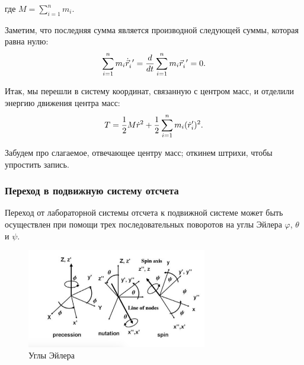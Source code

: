 \hspace*{-0.75cm} где $M = \sum_{i=1}^{n} m_i$.

Заметим, что последняя сумма является производной следующей суммы, которая равна нулю: 
\vspace*{-0.1cm}
\begin{gather}
\sum_{i=1}^{n} m_i \dot{\vec{r}}_i^{\ \prime} = \frac{d}{dt} \sum_{i=1}^{n} m_i \vec{r}_i^{\ \prime} = 0. \notag
\end{gather}

Итак, мы перешли в систему координат, связанную с центром масс, и отделили энергию движения центра масс:
\vspace*{-0.1cm}
\begin{gather}
T = \frac{1}{2} M \dot{r}^2 + \frac{1}{2} \sum_{i=1}^{n} m_i( \dot{r}_i^\prime)^2. \notag
\end{gather}

Забудем про слагаемое, отвечающее центру масс; откинем штрихи, чтобы упростить запись.

\subsubsection{Переход в подвижную систему отсчета}

\hspace{0.48cm} Переход от лабораторной системы отсчета к подвижной системе может быть осуществлен при помощи трех последовательных поворотов на углы Эйлера $\varphi$, $\theta$ и $\psi$. 

\begin{figure}
  \centering
	\includegraphics[width=0.7\textwidth]{../pictures/EulerAngles.jpg}
	\caption{Углы Эйлера}
	\label{fig:EulerAngles}
\end{figure}

